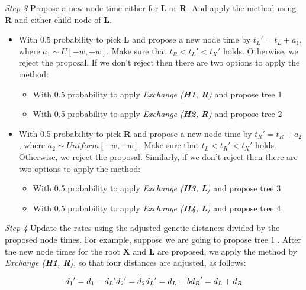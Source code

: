 \documentclass{bmcart}
\begin{document}
\emph{Step 3} Propose a new node time either for \textbf{L} or \textbf{R}. And apply the method using \textbf{R} and either child node of \textbf{L}.
\begin{itemize}
\item With 0.5 probability to pick \textbf{L} and propose a new node time by ${t_L}' = {t_L} + {a_1}$, where ${a_1} \sim U[ - w, + w]$. Make sure that ${t_R} < {t_L}' < {t_X}'$ holds. Otherwise, we reject the proposal. If we don't reject then there are two options to apply the method:
\begin{itemize}
\item With 0.5 probability to apply \textit{Exchange (\textbf{H1}, \textbf{R})} and propose tree \textcircled1

\item With 0.5 probability to apply \textit{Exchange (\textbf{H2}, \textbf{R})} and propose tree \textcircled2
\end{itemize}

\item With 0.5 probability to pick \textbf{R} and propose a new node time by ${t_R}' = {t_R} + {a_2}$, where ${a_2} \sim Uniform[ - w, + w]$. Make sure that ${t_L} < {t_R}' < {t_X}'$ holds. Otherwise, we reject the proposal. Similarly, if we don't reject then there are two options to apply the method:
  \begin{itemize}
  \item With 0.5 probability to apply \textit{Exchange (\textbf{H3}, \textbf{L})} and propose tree \textcircled3
  \item With 0.5 probability to apply \textit{Exchange (\textbf{H4}, \textbf{L})} and propose tree \textcircled4
  \end{itemize}
\end{itemize}

\emph{Step 4}  Update the rates using the adjusted genetic distances divided by the proposed node times. For example, suppose we are going to propose tree \textcircled1. After the new node times for the root \textbf{X} and \textbf{L} are proposed, we apply the method by \textit{Exchange (\textbf{H1}, \textbf{R})}, so that four distances are adjusted, as follows:

\begin{equation}\label{example1.1}
{d_1}' = {d_1} - {d_L}'  \\
{d_2}' = {d_2} \\
{d_L}' = {d_L} + b \\
{d_R}' = {d_L} + {d_R}
\end{equation}
\end{document}
